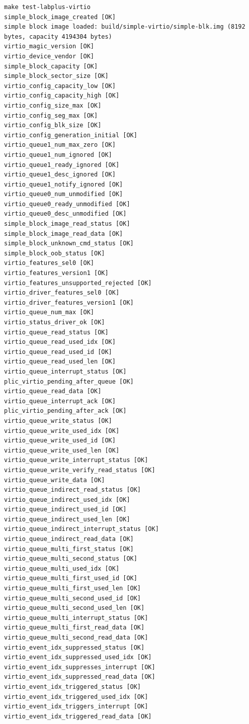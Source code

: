 \documentclass[UTF8,a4paper,11pt]{ctexart}
\begin{document}
\begin{Verbatim}[fontsize=\small]
make test-labplus-virtio
simple_block_image_created [OK]
simple block image loaded: build/simple-virtio/simple-blk.img (8192 bytes, capacity 4194304 bytes)
virtio_magic_version [OK]
virtio_device_vendor [OK]
simple_block_capacity [OK]
simple_block_sector_size [OK]
virtio_config_capacity_low [OK]
virtio_config_capacity_high [OK]
virtio_config_size_max [OK]
virtio_config_seg_max [OK]
virtio_config_blk_size [OK]
virtio_config_generation_initial [OK]
virtio_queue1_num_max_zero [OK]
virtio_queue1_num_ignored [OK]
virtio_queue1_ready_ignored [OK]
virtio_queue1_desc_ignored [OK]
virtio_queue1_notify_ignored [OK]
virtio_queue0_num_unmodified [OK]
virtio_queue0_ready_unmodified [OK]
virtio_queue0_desc_unmodified [OK]
simple_block_image_read_status [OK]
simple_block_image_read_data [OK]
simple_block_unknown_cmd_status [OK]
simple_block_oob_status [OK]
virtio_features_sel0 [OK]
virtio_features_version1 [OK]
virtio_features_unsupported_rejected [OK]
virtio_driver_features_sel0 [OK]
virtio_driver_features_version1 [OK]
virtio_queue_num_max [OK]
virtio_status_driver_ok [OK]
virtio_queue_read_status [OK]
virtio_queue_read_used_idx [OK]
virtio_queue_read_used_id [OK]
virtio_queue_read_used_len [OK]
virtio_queue_interrupt_status [OK]
plic_virtio_pending_after_queue [OK]
virtio_queue_read_data [OK]
virtio_queue_interrupt_ack [OK]
plic_virtio_pending_after_ack [OK]
virtio_queue_write_status [OK]
virtio_queue_write_used_idx [OK]
virtio_queue_write_used_id [OK]
virtio_queue_write_used_len [OK]
virtio_queue_write_interrupt_status [OK]
virtio_queue_write_verify_read_status [OK]
virtio_queue_write_data [OK]
virtio_queue_indirect_read_status [OK]
virtio_queue_indirect_used_idx [OK]
virtio_queue_indirect_used_id [OK]
virtio_queue_indirect_used_len [OK]
virtio_queue_indirect_interrupt_status [OK]
virtio_queue_indirect_read_data [OK]
virtio_queue_multi_first_status [OK]
virtio_queue_multi_second_status [OK]
virtio_queue_multi_used_idx [OK]
virtio_queue_multi_first_used_id [OK]
virtio_queue_multi_first_used_len [OK]
virtio_queue_multi_second_used_id [OK]
virtio_queue_multi_second_used_len [OK]
virtio_queue_multi_interrupt_status [OK]
virtio_queue_multi_first_read_data [OK]
virtio_queue_multi_second_read_data [OK]
virtio_event_idx_suppressed_status [OK]
virtio_event_idx_suppressed_used_idx [OK]
virtio_event_idx_suppresses_interrupt [OK]
virtio_event_idx_suppressed_read_data [OK]
virtio_event_idx_triggered_status [OK]
virtio_event_idx_triggered_used_idx [OK]
virtio_event_idx_triggers_interrupt [OK]
virtio_event_idx_triggered_read_data [OK]

\end{Verbatim}
\end{document}
